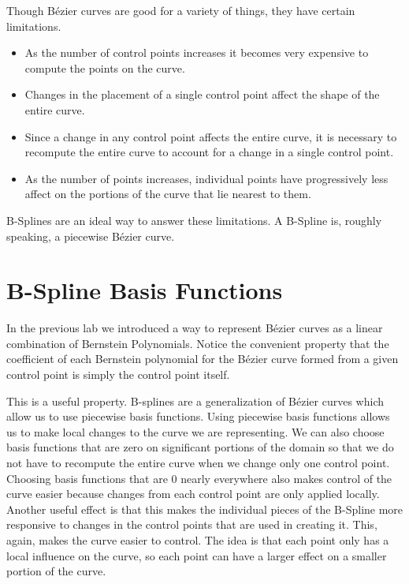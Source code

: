 Though B\'{e}zier curves are good for a variety of things, they have certain limitations.
\begin{itemize}
\item As the number of control points increases it becomes very expensive to compute the points on the curve.
\item Changes in the placement of a single control point affect the shape of the entire curve.
\item Since a change in any control point affects the entire curve, it is necessary to recompute the entire curve to account for a change in a single control point.
\item As the number of points increases, individual points have progressively less affect on the portions of the curve that lie nearest to them.
\end{itemize}

B-Splines are an ideal way to answer these limitations.
A B-Spline is, roughly speaking, a piecewise B\'{e}zier curve.

\section*{B-Spline Basis Functions}

In the previous lab we introduced a way to represent B\'{e}zier curves as a linear combination of Bernstein Polynomials.
Notice the convenient property that the coefficient of each Bernstein polynomial for the B\'{e}zier curve formed from a given control point is simply the control point itself.

This is a useful property.
B-splines are a generalization of B\'{e}zier curves which allow us to use piecewise basis functions.
Using piecewise basis functions allows us to make local changes to the curve we are representing.
We can also choose basis functions that are zero on significant portions of the domain so that we do not have to recompute the entire curve when we change only one control point.
Choosing basis functions that are 0 nearly everywhere also makes control of the curve easier because changes from each control point are only applied locally.
Another useful effect is that this makes the individual pieces of the B-Spline more responsive to changes in the control points that are used in creating it.
This, again, makes the curve easier to control.
The idea is that each point only has a local influence on the curve, so each point can have a larger effect on a smaller portion of the curve.

